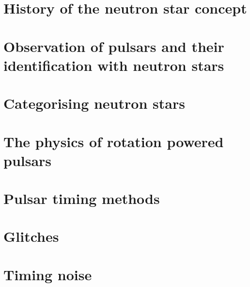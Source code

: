 \documentclass[../full_thesis/full_thesis.tex]{subfiles}
\newcommand{\IntroductionDir}{../introduction}
\begin{document}
 

\section{History of the neutron star concept}


\section{Observation of pulsars and their identification with neutron stars}


\section{Categorising neutron stars}


\section{The physics of rotation powered pulsars} 
\label{sec: rotation powered pulsars}


\FloatBarrier
%

\section{Pulsar timing methods}
\label{sec: pulsar timing methods}


\section{Glitches}
\label{ref: glitches}


\FloatBarrier
\section{Timing noise}
\label{sec: timing noise}


\biblio
\end{document}
